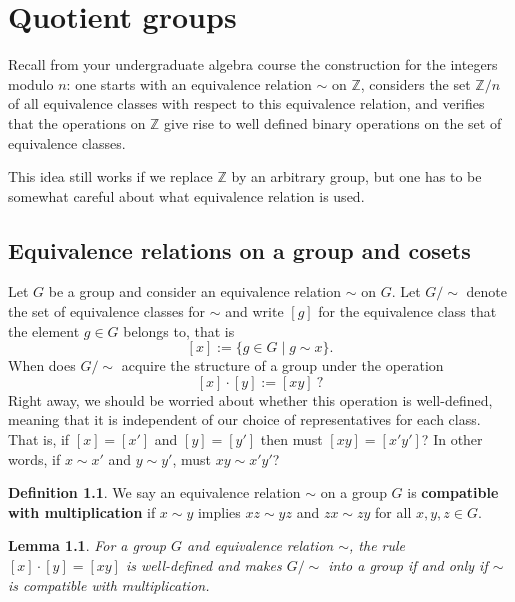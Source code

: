 \documentclass[12pt]{report}
\newtheorem{lemma}[theorem]{Lemma}
\numberwithin{equation}{section}
\numberwithin{theorem}{chapter}
\theoremstyle{definition}
\newtheorem{definition}[theorem]{Definition}
\newtheorem*{basic properties}{Basic Properties}
\newtheorem*{Important Remark}{Important Remark}
\begin{document}
\chapter{Quotient groups}

Recall from your undergraduate algebra course the construction for the integers modulo $n$: one starts with an equivalence relation $\sim$ on $\mathbb{Z}$, considers the set $\mathbb{Z}/n$ of all equivalence classes with respect to this equivalence relation, and verifies that the operations on $\mathbb{Z}$ give rise to well defined binary operations on the set of equivalence classes. 

This idea still works if we replace $\mathbb{Z}$ by an arbitrary group, but one has to be somewhat careful about what equivalence relation is used. 

\section{Equivalence relations on a group and cosets}
 
Let $G$ be a group and consider an equivalence relation $\sim$ on $G$.
Let $G/\sim$ denote the set of equivalence classes for $\sim$ and write $[g]$ for the equivalence class that the element $g \in G$ belongs to, that is
$$[x] := \{g \in G \mid g \sim x\}.$$
When does $G/\sim$ acquire the structure of a group under the operation
$$[x] \cdot [y] := [xy] \ ?$$
Right away, we should be worried about whether this operation is well-defined, meaning that it is independent of our choice of representatives for each class. That is, if $[x] = [x']$ and $[y] = [y']$  then must $[xy] = [x'y']$? In other words, if $x \sim x'$ and $y \sim y'$, must $xy \sim x'y'$? 


\begin{definition}
We say an equivalence relation $\sim$ on a group $G$ is {\bf compatible with multiplication} if $x \sim y$ implies $xz \sim yz$ and $zx \sim zy$ for all $x,y,z \in G$.
 \end{definition}

\begin{lemma}\label{quotient group operation well-defined}
For a group $G$ and equivalence relation $\sim$, the rule $[x] \cdot [y] = [xy]$ is well-defined and makes $G/\sim$ into a group if and only if $\sim$ is compatible with multiplication.
\end{lemma}
\end{document}
